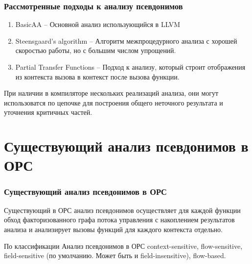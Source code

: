 \documentclass[utf8,russian]{beamer}
\begin{document}
\begin{frame}
\frametitle{Рассмотренные подходы к анализу псевдонимов}

\begin{block}{}
\begin{enumerate}
\item BasicAA -- Основной анализ использующийся в LLVM
\item Steensgaard’s algorithm -- Алгоритм межпроцедурного анализа с хорошей скоростью работы, но с большим числом упрощений.
\item Partial Transfer Functions -- Подход к анализу, который строит отображения из контекста вызова в контекст после вызова функции.
\end{enumerate}
\end{block}

\begin{block}{}
При наличии в компиляторе нескольких реализаций анализа, они могут использоватся по цепочке для построения общего неточного результата и уточнения критичных частей.
\end{block}
\end{frame}

\section{Существующий анализ псевдонимов в ОРС}

\begin{frame}
\frametitle{Существующий анализ псевдонимов в ОРС}

\begin{block}{}
Существующий в ОРС анализ псевдонимов осуществляет для каждой функции обход факторизованного графа потока управления с накоплением результатов анализа и анализирует вызовы функций для каждого контекста отдельно.
\end{block}

\begin{block}{По классификации}
Анализ псевдонимов в ОРС context-sensitive, flow-sensitive, field-sensitive (по умолчанию. Может быть и field-insensitive), flow-based.
\end{block}

\end{frame}
\end{document}
